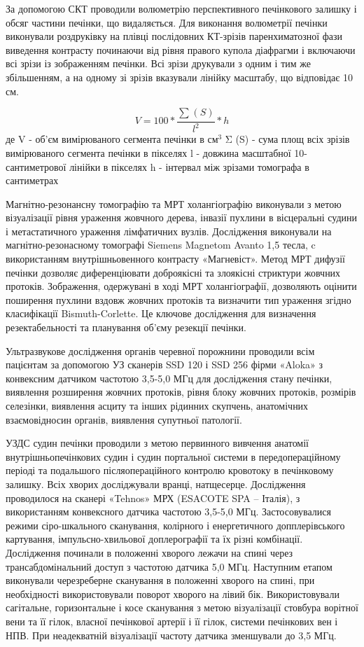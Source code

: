 За допомогою СКТ проводили волюметрію перспективного печінкового залишку і обсяг  частини печінки, що видаляється. Для виконання волюметрії печінки виконували роздруківку на плівці послідовних КТ-зрізів паренхиматозної фази виведення контрасту починаючи від рівня правого купола діафрагми і включаючи всі зрізи із зображенням печінки. Всі зрізи друкували з одним і тим же збільшенням, а на одному зі зрізів вказували лінійку масштабу, що відповідає 10 см.

\[ V = 100 * \frac{\sum_{} (S)}{l^2}*h \]
де 
V - об'єм вимірюваного сегмента печінки в см$^3$
Σ (S) - сума площ всіх зрізів вимірюваного сегмента печінки в пікселях
l - довжина масштабної 10-сантиметрової лінійки в пікселях
h - інтервал між зрізами томографа в сантиметрах

Магнітно-резонансну томографію та МРТ холангіографію виконували з метою візуалізації рівня ураження жовчного дерева, інвазії пухлини в вісцеральні судини і метастатичного ураження лімфатичних вузлів.  Дослідження виконували на магнітно-резонасному томографі Siemens Magnetom Avanto 1,5 тесла, c використанням внутрішньовенного контрасту «Магневіст». Метод МРТ дифузії печінки дозволяє диференціювати доброякісні та злоякісні стриктури жовчних протоків. Зображення, одержувані в ході МРТ холангіографії, дозволяють оцінити поширення пухлини вздовж жовчних протоків та визначити тип ураження згідно класифікації Bismuth-Corlette. Це ключове дослідження для визначення резектабельності та планування об'єму резекції печінки.

Ультразвукове дослідження органів черевної порожнини проводили всім пацієнтам за допомогою УЗ сканерів SSD 120 і SSD 256 фірми «Aloka» з конвексним датчиком частотою 3,5-5,0 МГц для дослідження стану печінки, виявлення розширення жовчних протоків, рівня блоку жовчних протоків, розмірів селезінки, виявлення асциту та інших рідинних скупчень, анатомічних взаємовідносин органів, виявлення супутньої патології.

УЗДС судин печінки проводили з метою первинного вивчення анатомії внутрішньопечінкових судин і судин портальної системи в передопераційному періоді та подальшого післяопераційного контролю кровотоку в печінковому залишку. Всіх хворих досліджували вранці, натщесерце. Дослідження проводилося на сканері «Tehnos» МРХ (ESACOTE SPA – Італія), з використанням конвексного датчика частотою 3,5-5,0 МГц. Застосовувалися режими сіро-шкального сканування, колірного і енергетичного допплерівського картування, імпульсно-хвильової доплерографії та їх різні комбінації. Дослідження починали в положенні хворого лежачи на спині через трансабдомінальний доступ з частотою датчика 5,0 МГц. Наступним етапом виконували черезреберне сканування в положенні хворого на спині, при необхідності використовували поворот хворого на лівий бік. Використовували сагітальне, горизонтальне і косе сканування з метою візуалізації стовбура ворітної вени та її гілок, власної печінкової артерії і її гілок, системи печінкових вен і НПВ. При неадекватній візуалізації частоту датчика зменшували до 3,5 МГц.

